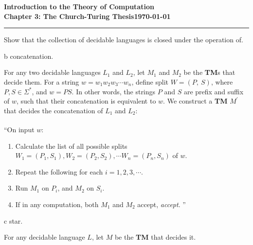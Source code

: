\documentclass[11pt]{article}
\newcommand{\dated}{\today}
\begin{document}
\textbf{Introduction to the Theory of
Computation}\hfill\textbf{\myname}\\[0.01in]
\textbf{Chapter 3: The Church-Turing Thesis}\hfill\textbf{\dated}\\
\smallskip\hrule\bigskip

\begin{problem}{3.15}
Show that the collection of decidable languages is closed under the operation of.
\end{problem}

\begin{problem}[Part]{b}
concatenation.
\end{problem}

For any two decidable languages $L_1$ and $L_2$, let $M_1$ and $M_2$ be the \textbf{TM}s that decide them. For a string $w = w_1w_2w_3 \cdots w_n$, define split $W = (P, \ S)$, where $P, S \in \Sigma^*$, and $w = PS$. In other words, the strings $P$ and $S$ are prefix and suffix of $w$, such that their concatenation is equivalent to $w$. We construct a \textbf{TM} $M^{'}$ that decides the concatenation of $L_1$ and $L_2$: \\
\\
\textquotedblleft On input $w$:
\begin{enumerate}
\item Calculate the list of all possible splits $W_1 = (P_1, S_1), W_2 = (P_2, S_2), \cdots W_n = (P_n, S_n)$ of $w$.
\item Repeat the following for each $i = 1, 2, 3, \cdots$.
\item \hspace*{0.5cm} Run $M_1$ on $P_i$, and $M_2$ on $S_i$.
\item \hspace*{0.5cm} If in any computation, both $M_1$ and $M_2$ accept, \textit{accept}. \textquotedblright
\end{enumerate}

\begin{problem}[Part]{c}
star.
\end{problem}

For any decidable language $L$, let $M$ be the \textbf{TM} that decides it.
\end{document}

